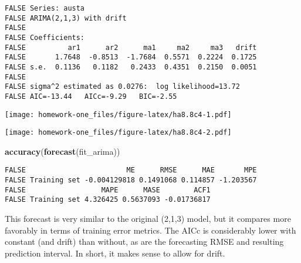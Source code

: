 \documentclass[openany]{book}
\newenvironment{Shaded}{\begin{snugshade}}{\end{snugshade}}
\newcommand{\DataTypeTok}[1]{\textcolor[rgb]{0.13,0.29,0.53}{#1}}
\newcommand{\DecValTok}[1]{\textcolor[rgb]{0.00,0.00,0.81}{#1}}
\newcommand{\KeywordTok}[1]{\textcolor[rgb]{0.13,0.29,0.53}{\textbf{#1}}}
\newcommand{\NormalTok}[1]{#1}
\newcommand{\OperatorTok}[1]{\textcolor[rgb]{0.81,0.36,0.00}{\textbf{#1}}}
\newcommand{\StringTok}[1]{\textcolor[rgb]{0.31,0.60,0.02}{#1}}
\begin{document}
\begin{verbatim}
FALSE Series: austa 
FALSE ARIMA(2,1,3) with drift 
FALSE 
FALSE Coefficients:
FALSE          ar1      ar2      ma1     ma2     ma3   drift
FALSE       1.7648  -0.8513  -1.7684  0.5571  0.2224  0.1725
FALSE s.e.  0.1136   0.1182   0.2433  0.4351  0.2150  0.0051
FALSE 
FALSE sigma^2 estimated as 0.0276:  log likelihood=13.72
FALSE AIC=-13.44   AICc=-9.29   BIC=-2.55
\end{verbatim}

\begin{Shaded}
\end{Shaded}

\texttt{[image: homework-one\_files/figure-latex/ha8.8c4-1.pdf]}

\begin{Shaded}
\end{Shaded}

\texttt{[image: homework-one\_files/figure-latex/ha8.8c4-2.pdf]}

\begin{Shaded}
\begin{Highlighting}[]
\KeywordTok{accuracy}\NormalTok{(}\KeywordTok{forecast}\NormalTok{(fit_arima))}
\end{Highlighting}
\end{Shaded}

\begin{verbatim}
FALSE                        ME      RMSE      MAE       MPE
FALSE Training set -0.004129818 0.1491068 0.114857 -1.203567
FALSE                  MAPE      MASE        ACF1
FALSE Training set 4.326425 0.5637093 -0.01736817
\end{verbatim}

This forecast is very similar to the original (2,1,3) model, but it compares more favorably in terms of training error metrics. The AICc is considerably lower with constant (and drift) than without, as are the forecasting RMSE and resulting prediction interval. In short, it makes sense to allow for drift.
\end{document}
